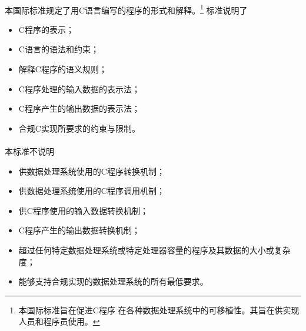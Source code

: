 
\paragraph{}
本国际标准规定了用C语言编写的程序的形式和解释。\footnote{本国际标准旨在促进C程序
在各种数据处理系统中的可移植性。其旨在供实现人员和程序员使用。} 标准说明了
\begin{itemize}
  \item{C程序的表示；}
  \item{C语言的语法和约束；}
  \item{解释C程序的语义规则；}
  \item{C程序处理的输入数据的表示法；}
  \item{C程序产生的输出数据的表示法；}
  \item{合规C实现所要求的约束与限制。}
\end{itemize}

\paragraph{}
本标准不说明
\begin{itemize}
  \item{供数据处理系统使用的C程序转换机制；}
  \item{供数据处理系统使用的C程序调用机制；}
  \item{供C程序使用的输入数据转换机制；}
  \item{C程序产生的输出数据转换机制；}
  \item{超过任何特定数据处理系统或特定处理器容量的程序及其数据的大小或复杂度；}
  \item{能够支持合规实现的数据处理系统的所有最低要求。}
\end{itemize}
